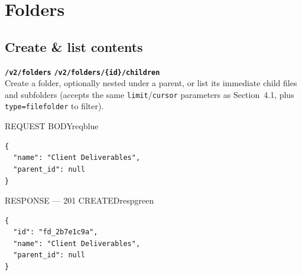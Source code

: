\section{Folders}

\subsection{Create \& list contents}
\begin{routebox}
\hspace{6pt}\texttt{\textbf{/v2/folders}}\hspace{10pt}
\hspace{6pt}\texttt{\textbf{/v2/folders/\{id\}/children}}\\[3pt]
{\small Create a folder, optionally nested under a parent, or list its immediate child
files and subfolders (accepts the same \texttt{limit}/\texttt{cursor} parameters as
Section~4.1, plus \texttt{type=file\textbar folder} to filter).}
\end{routebox}

\begin{minipage}[t]{0.48\textwidth}
\begin{jsonpanel}{REQUEST BODY}{reqblue}
\begin{lstlisting}
{
  "name": "Client Deliverables",
  "parent_id": null
}
\end{lstlisting}
\end{jsonpanel}
\end{minipage}\hfill
\begin{minipage}[t]{0.48\textwidth}
\begin{jsonpanel}{RESPONSE — 201 CREATED}{respgreen}
\begin{lstlisting}
{
  "id": "fd_2b7e1c9a",
  "name": "Client Deliverables",
  "parent_id": null
}
\end{lstlisting}
\end{jsonpanel}
\end{minipage}
\par


